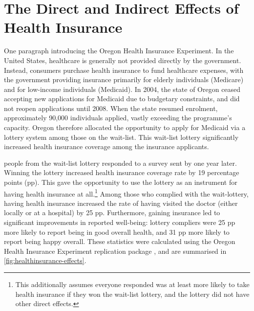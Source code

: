 \section{The Direct and Indirect Effects of Health Insurance}
\label{sec:healthinsurance}

One paragraph introducing the Oregon Health Insurance Experiment.
In the United States, healthcare is generally not provided directly by the government.
Instead, consumers purchase health insurance to fund healthcare expenses, with the government providing insurance primarily for elderly individuals (Medicare) and for low-income individuals (Medicaid).
In 2004, the state of Oregon ceased accepting new applications for Medicaid due to budgetary constraints, and did not reopen applications until 2008.
When the state resumed enrolment, approximately 90,000 individuals applied, vastly exceeding the programme's capacity.
Oregon therefore allocated the opportunity to apply for Medicaid via a lottery system among those on the wait-list.
This wait-list lottery significantly increased health insurance coverage among the insurance applicants.

 people from the wait-list lottery responded to a survey sent by \cite{finkelstein2008oregon} one year later.
Winning the lottery increased health insurance coverage rate by 19 percentage points (pp).
This gave the opportunity to use the lottery as an instrument for having health insurance at all.\footnote{
    This additionally assumes everyone responded was at least more likely to take health insurance if they won the wait-list lottery, and the lottery did not have other direct effects.
}
Among those who complied with the wait-lottery, having health insurance increased the rate of having visited the doctor (either locally or at a hospital) by 25 pp.
Furthermore, gaining insurance led to significant improvements in reported well-being: lottery compliers were 25 pp more likely to report being in good overall health, and 31 pp more likely to report being happy overall.
These statistics were calculated using the Oregon Health Insurance Experiment replication package \citep{icspr2014oregon}, and are summarised in \autoref{fig:healthinsurance-effects}.

